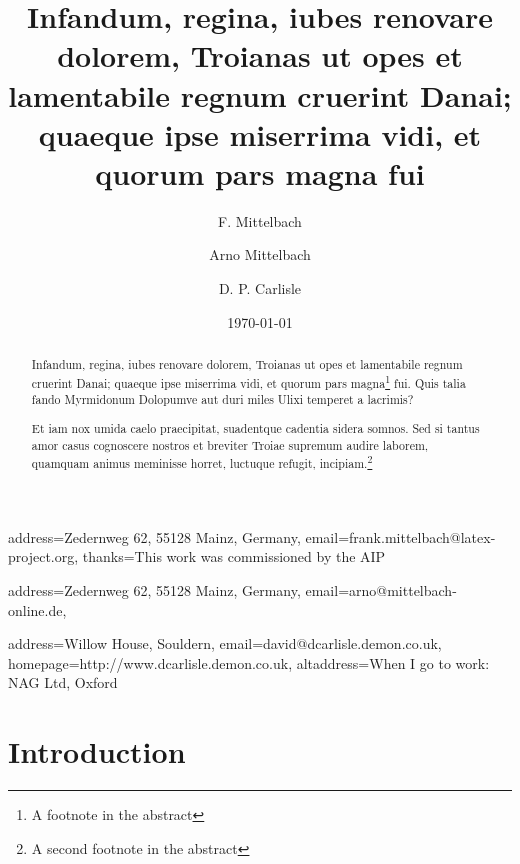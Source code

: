 \documentclass[
   \selectedoptions
  ]
  {aipproc}
\begin{document}
\title 
      [Infandum, regina, iubes renovare dolorem]
      {Infandum, regina, iubes renovare dolorem, Troianas ut opes et
lamentabile regnum cruerint Danai; quaeque ipse miserrima vidi, et
quorum pars magna fui}


\author{F. Mittelbach}{
  address={Zedernweg 62, 55128 Mainz, Germany},
  email={frank.mittelbach@latex-project.org},
  thanks={This work was commissioned by the AIP}
}

\iftrue
\author{Arno Mittelbach}{
  address={Zedernweg 62, 55128 Mainz, Germany},
  email={arno@mittelbach-online.de},
}

\author{D. P. Carlisle}{
  address={Willow House, Souldern},
  email={david@dcarlisle.demon.co.uk},
  homepage={http://www.dcarlisle.demon.co.uk},
  altaddress={When I go to work: NAG Ltd, Oxford}
}
\fi




\begin{abstract}
Infandum, regina, iubes renovare dolorem, Troianas ut opes et
lamentabile regnum cruerint Danai; quaeque ipse miserrima vidi, et
quorum pars magna\thanks{A footnote in the abstract} fui. Quis talia
fando Myrmidonum Dolopumve aut duri miles Ulixi temperet a lacrimis?

Et iam nox umida caelo praecipitat, suadentque cadentia sidera
somnos. Sed si tantus amor casus cognoscere nostros et breviter Troiae
supremum audire laborem, quamquam animus meminisse horret, luctuque
refugit, incipiam.\thanks{A second footnote in the abstract}
\end{abstract}


\date{\today}


\maketitle

\section{Introduction}


\end{document}
